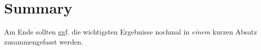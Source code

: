 \par{

}


\section{Summary}
\label{ch:Analyse:sec:Summary}

Am Ende sollten ggf. die wichtigsten Ergebnisse nochmal in \emph{einem}
kurzen Absatz zusammengefasst werden.

